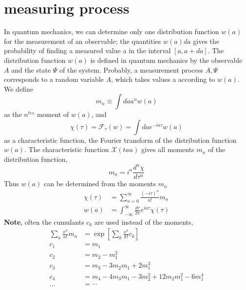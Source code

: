 \section{measuring process}
In quantum mechanics, we can determine only one distribution function $w (a)$ for the measurement of an observable; the quantities $w (a) da$ gives the probability of finding a measured value a in the interval $[a, a + da]$. The distribution function $w (a)$ is defined in quantum mechanics by the observable $A$ and the state $\Psi$ of the system. Probably, a measurement process {$A,\Psi$} corresponds to a random variable $A$, which takes values ​​a according to $w (a)$. We define
\begin{equation}
    m_{n} \equiv \int d a a^{n} w(a)
    \end{equation}
as the $n^{tes}$ moment of $w (a)$, and
\begin{equation}
    \chi(\tau)=\mathcal{F}_{\tau}(w)=\int d a e^{-i a \tau} w(a)
    \end{equation}
as a characteristic function, the Fourier transform of the distribution function $w (a)$. The characteristic function $\mathcal{X}(tau)$ gives all moments $m_n$ of the distribution function,
\begin{equation}
    m_{n}=i^{n} \frac{d^{n} \chi}{d \tau^{n}}
    \end{equation}
Thus $w (a)$ can be determined from the moments $m_n$
\begin{equation}
\begin{aligned} \chi(\tau) &=\sum_{n=0}^{\infty} \frac{(-i \tau)^{n}}{n !} m_{n} \\ w(a) &=\int_{-\infty}^{\infty} \frac{d \tau}{2 \pi} e^{i a \tau} \chi(\tau) \end{aligned}
\end{equation}
\textbf{Note}, often the cumulants $c_k$ are used instead of the moments,
\begin{equation}
\begin{aligned} \sum_{n} \frac{x^{n}}{n !} m_{n} &=\exp \left[\sum_{k} \frac{x^{k}}{k !} c_{k}\right] \\ c_{1} &=m_{1} \\ c_{2} &=m_{2}-m_{1}^{2} \\ c_{3} &=m_{3}-3 m_{2} m_{1}+2 m_{1}^{3} \\ c_{4} &=m_{4}-4 m_{3} m_{1}-3 m_{2}^{2}+12 m_{2} m_{1}^{2}-6 m_{1}^{4} \\ \ldots &=\cdots \end{aligned}
\end{equation}
